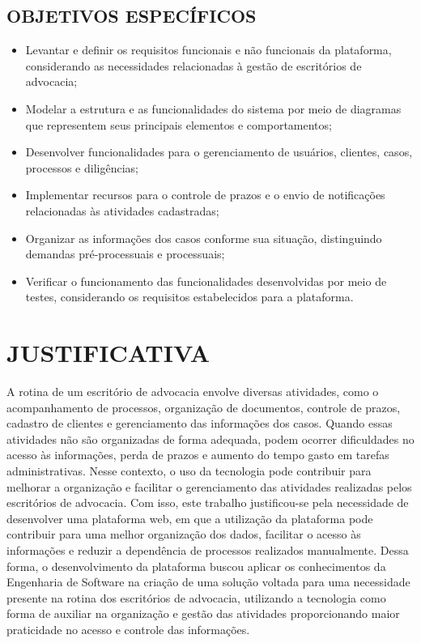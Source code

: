 \subsection{OBJETIVOS ESPECÍFICOS}
    \begin{itemize}
    \item Levantar e definir os requisitos funcionais e não funcionais da plataforma, considerando as necessidades relacionadas à gestão de escritórios de advocacia;
    
    \item Modelar a estrutura e as funcionalidades do sistema por meio de diagramas que representem seus principais elementos e comportamentos;
    
    \item Desenvolver funcionalidades para o gerenciamento de usuários, clientes, casos, processos e diligências;
    
    \item Implementar recursos para o controle de prazos e o envio de notificações relacionadas às atividades cadastradas;
    
    \item Organizar as informações dos casos conforme sua situação, distinguindo demandas pré-processuais e processuais;
    
    \item Verificar o funcionamento das funcionalidades desenvolvidas por meio de testes, considerando os requisitos estabelecidos para a plataforma.
\end{itemize}

\section{JUSTIFICATIVA}
A rotina de um escritório de advocacia envolve diversas atividades, como o acompanhamento de processos, 
organização de documentos, controle de prazos, cadastro de clientes e gerenciamento das informações dos 
casos. Quando essas atividades não são organizadas de forma adequada, podem ocorrer dificuldades no acesso 
às informações, perda de prazos e aumento do tempo gasto em tarefas administrativas.
Nesse contexto, o uso da tecnologia pode contribuir  para melhorar a organização e facilitar o gerenciamento 
das atividades realizadas pelos escritórios de advocacia. Com isso, este trabalho justificou-se pela necessidade de 
desenvolver uma plataforma web, em que a utilização da plataforma pode contribuir para uma melhor organização dos dados, 
facilitar o acesso às informações e reduzir a dependência de processos realizados manualmente.
Dessa forma, o desenvolvimento da plataforma buscou aplicar os conhecimentos da Engenharia de Software na 
criação de uma solução voltada para uma necessidade presente na rotina dos escritórios de advocacia, utilizando 
a tecnologia como forma de auxiliar na organização e gestão das atividades proporcionando maior praticidade no acesso
e controle das informações.



